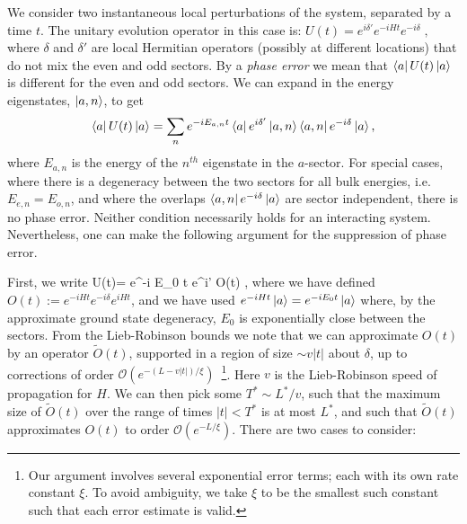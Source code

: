 \documentclass[aps,pra,floatfix,footinbib,longbibliography,twocolumn,superscriptaddress, preprintnumbers, nobibnotes]{revtex4-1}
\begin{document}
We consider two instantaneous local perturbations of the system, separated by a time $t$. The unitary evolution operator in this case is:
$
U(t) = e^{i \delta'} e^{-i H t} e^{-i \delta}\label{eq:two_kick_unitary} \; ,
$
where $\delta$ and $\delta'$ are local Hermitian operators (possibly at different locations) that do not mix the even and odd sectors. By a \emph{phase error} we mean that $\left\langle a\right|U(t)\left|a\right\rangle$ is different for the even and odd sectors. We can expand in the energy eigenstates, $\left|a ,n\right\rangle$, to get
\begin{equation}\label{eq:eigenstate_expansion}
\left\langle a\right|U(t)\left|a\right\rangle = \sum_n e^{-i E_{a,n} t} \left\langle a\right|e^{i \delta'}\left|a,n\right\rangle\left\langle a,n\right| e^{-i \delta}\left|a\right\rangle,
\end{equation}
where $E_{a,n}$ is the energy of the $n^{th}$ eigenstate in the $a$-sector. For special cases, where there is a degeneracy between the two sectors for all bulk energies, i.e. $E_{e,n}=E_{o,n}$, and where the overlaps $\left\langle a,n\right| e^{-i \delta}\left|a\right\rangle$ are sector independent, there is no phase error. Neither condition necessarily holds for an interacting system. Nevertheless, one can make the following argument for the suppression of phase error.

First, we write
\be
{}U(t)= e^{-i E_0 t} e^{i\delta '}  O(t) ,
\ee
where we have defined $O(t) := e^{-i H t} e^{-i \delta}e^{i H t}$, and we have used $e^{-i H t} \left|a\right\rangle = e^{-i E_0 t} \left|a\right\rangle$ where, by the approximate ground state degeneracy, $E_0$ is  exponentially close between the sectors. From the Lieb-Robinson bounds \cite{Lieb:1972wy} we note that we can approximate $O(t)$ by an operator $\tilde{O}(t)$, supported in a region of size $\sim v |t|$ about $\delta$, up to corrections of order $\mathcal{O}(e^{-(L - v |t|)/ \xi})$~\footnote{Our argument involves several exponential error terms; each with its own rate constant $\xi$. To avoid ambiguity, we take $\xi$ to be the smallest such constant such that each error estimate is valid.}. Here $v$ is the Lieb-Robinson speed of propagation for $H$. We can then pick some $T^* \sim L^*/v$, such that the maximum size of $\tilde{O}(t)$ over the range of times $|t| < T^*$ is at most $L^*$, and such that $\tilde{O}(t)$ approximates $O(t)$ to order $\mathcal{O}(e^{-L/\xi})$. There are two cases to consider:
\end{document}
